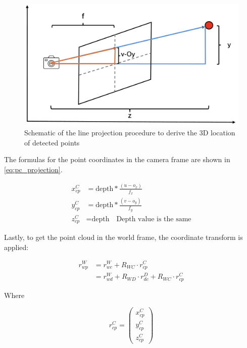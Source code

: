 \begin{figure}[h]
\centering
\includegraphics[scale=0.25]{images/stereo_camera_depth/similar_triangles.png}
\caption{Schematic of the line projection procedure to derive the 3D location of detected points}
\label{fig:similar_triangles}
\end{figure}

The formulas for the point coordinates in the camera frame are shown in \cref{eq:pc_projection}.

\begin{align}
    \label{eq:pc_projection}
    x_{cp}^C &= \text{depth} * \frac{\left(u - o_x\right)}{f_x}\\
    y_{cp}^C &= \text{depth} * \frac{\left(v - o_y\right)}{f_y}\\
    z_{cp}^C &= \text{depth} \quad \text{Depth value is the same}
\end{align}

Lastly, to get the point cloud in the world frame, the coordinate transform is applied:

\begin{align}
    r_{wp}^W &= r_{wc}^W + R_{WC} \cdot r_{cp}^C\\
             &= r_{wd}^W + R_{WD} \cdot r_{dc}^D + R_{WC} \cdot r_{cp}^C
    \label{eq:transform_CW}
\end{align}

Where

\begin{equation}
    r_{cp}^C = \begin{pmatrix}
        x_{cp}^C\\
        y_{cp}^C\\
        z_{cp}^C
    \end{pmatrix}
    \label{eq:camera_point_vector}
\end{equation}

